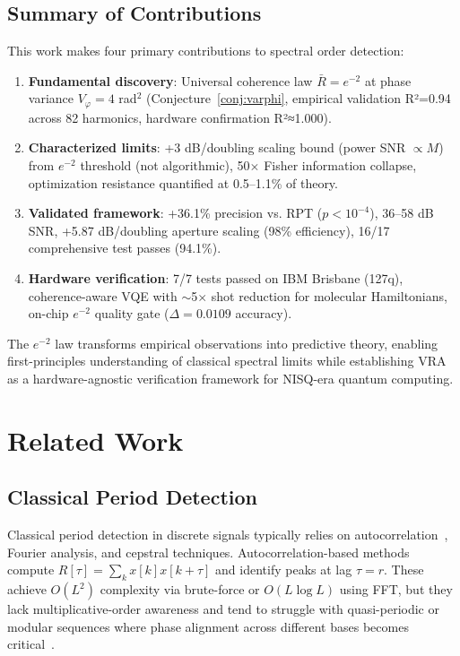 \documentclass[10pt,twocolumn]{article}
\begin{document}
\subsection{Summary of Contributions}

This work makes four primary contributions to spectral order detection:

\begin{enumerate}
\item \textbf{Fundamental discovery}: Universal coherence law $\bar{R} = e^{-2}$ at phase variance $V_\varphi = 4$ rad$^2$ (Conjecture~\ref{conj:varphi}, empirical validation R²=0.94 across 82 harmonics, hardware confirmation R²≈1.000).

\item \textbf{Characterized limits}: +3 dB/doubling scaling bound (power SNR $\propto M$) from $e^{-2}$ threshold (not algorithmic), 50$\times$ Fisher information collapse, optimization resistance quantified at 0.5--1.1\% of theory.

\item \textbf{Validated framework}: +36.1\% precision vs. RPT ($p < 10^{-4}$), 36--58 dB SNR, +5.87 dB/doubling aperture scaling (98\% efficiency), 16/17 comprehensive test passes (94.1\%).

\item \textbf{Hardware verification}: 7/7 tests passed on IBM Brisbane (127q), coherence-aware VQE with $\sim$5$\times$ shot reduction for molecular Hamiltonians, on-chip $e^{-2}$ quality gate ($\Delta = 0.0109$ accuracy).
\end{enumerate}

The $e^{-2}$ law transforms empirical observations into predictive theory, enabling first-principles understanding of classical spectral limits while establishing VRA as a hardware-agnostic verification framework for NISQ-era quantum computing.

\section{Related Work}

\subsection{Classical Period Detection}

Classical period detection in discrete signals typically relies on autocorrelation~\cite{oppenheim1999,rabiner1978}, Fourier analysis, and cepstral techniques. Autocorrelation-based methods compute $R[\tau] = \sum_k x[k]x[k+\tau]$ and identify peaks at lag $\tau = r$. These achieve $O(L^2)$ complexity via brute-force or $O(L \log L)$ using FFT, but they lack multiplicative-order awareness and tend to struggle with quasi-periodic or modular sequences where phase alignment across different bases becomes critical~\cite{oppenheim1999}.
\end{document}
